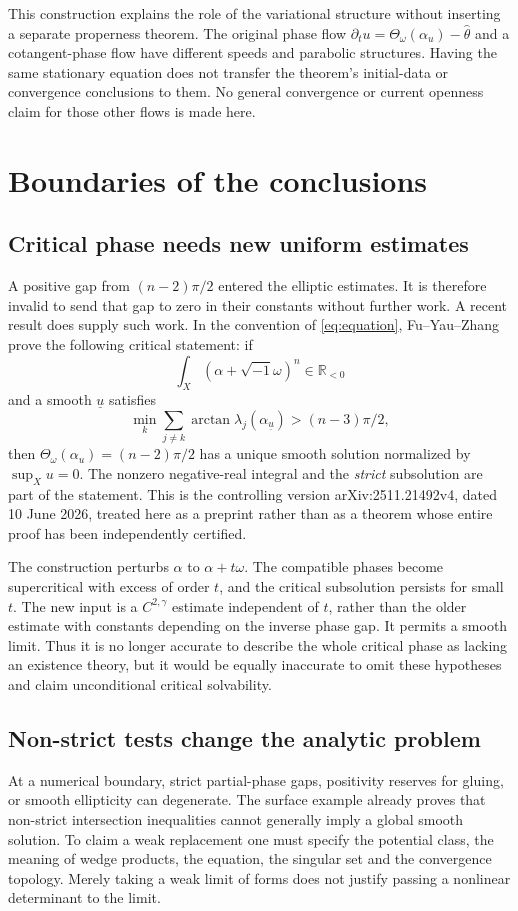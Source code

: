 \documentclass[12pt,reqno]{amsart}
\newcommand{\ii}{\sqrt{-1}}
\newcommand{\R}{\mathbb R}
\newcommand{\Th}{\Theta_\omega}
\newcommand{\hth}{\widehat\theta}
\begin{document}
This construction explains the role of the variational structure without inserting a separate properness theorem. The original phase flow $\partial_tu=\Th(\alpha_u)-\hth$ and a cotangent-phase flow have different speeds and parabolic structures. Having the same stationary equation does not transfer the theorem's initial-data or convergence conclusions to them. No general convergence or current openness claim for those other flows is made here.

\section{Boundaries of the conclusions}\label{sec:boundary}
\subsection{Critical phase needs new uniform estimates}
A positive gap from $(n-2)\pi/2$ entered the elliptic estimates. It is therefore invalid to send that gap to zero in their constants without further work. A recent result does supply such work. In the convention of \eqref{eq:equation}, Fu--Yau--Zhang \cite[Theorems 1.1--1.2]{FYZ} prove the following critical statement: if
\[
 \int_X(\alpha+\ii\omega)^n\in\R_{<0}
\]
and a smooth $\underline u$ satisfies
\[
 \min_k\sum_{j\ne k}\arctan\lambda_j(\alpha_{\underline u})
                   >(n-3)\pi/2,
\]
then $\Th(\alpha_u)=(n-2)\pi/2$ has a unique smooth solution normalized by $\sup_Xu=0$. The nonzero negative-real integral and the \emph{strict} subsolution are part of the statement. This is the controlling version arXiv:2511.21492v4, dated 10 June 2026, treated here as a preprint rather than as a theorem whose entire proof has been independently certified.

The construction perturbs $\alpha$ to $\alpha+t\omega$. The compatible phases become supercritical with excess of order $t$, and the critical subsolution persists for small $t$. The new input is a $C^{2,\gamma}$ estimate independent of $t$, rather than the older estimate with constants depending on the inverse phase gap. It permits a smooth limit. Thus it is no longer accurate to describe the whole critical phase as lacking an existence theory, but it would be equally inaccurate to omit these hypotheses and claim unconditional critical solvability.

\subsection{Non-strict tests change the analytic problem}
At a numerical boundary, strict partial-phase gaps, positivity reserves for gluing, or smooth ellipticity can degenerate. The surface example already proves that non-strict intersection inequalities cannot generally imply a global smooth solution. To claim a weak replacement one must specify the potential class, the meaning of wedge products, the equation, the singular set and the convergence topology. Merely taking a weak limit of forms does not justify passing a nonlinear determinant to the limit.
\end{document}
